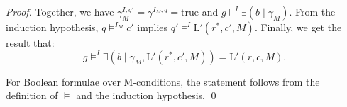 \documentclass{llncs}
\begin{document}
\begin{proof}
		\noindent Together, we have $\gamma_M^{I,q'} = \gamma^{I_M,q} = \text{true}$ and $g \models^{I} \exists(b\mid\gamma_M)$. From the induction hypothesis, $q \models^{I_M} c'$ implies $q' \models^I \text{L}'(r^*,c',M)$. Finally, we get the result that:
		\[ g \models^I \exists (b\mid\gamma_M, \text{L}'(r^*,c',M)) = \text{L}'(r,c,M).  \]
		
	
		For Boolean formulae over M-conditions, the statement follows from the definition of $\models$ and the induction hypothesis.
		\qed
	\end{proof}
	
	
	
\end{document}
